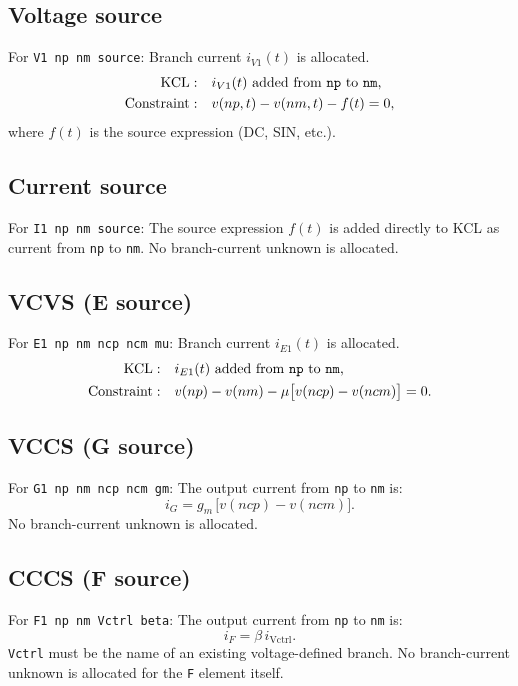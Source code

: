 \documentclass[11pt,a4paper]{article}
\newcommand{\code}[1]{\texttt{#1}}
\begin{document}
\subsection{Voltage source}

For \code{V1 np nm source}:
Branch current \(i_{V1}(t)\) is allocated.
\begin{align}
    \text{KCL}: & \quad i_{V1}(t) \text{ added from \code{np} to \code{nm},} \\
    \text{Constraint}: & \quad v(np,t) - v(nm,t) - f(t) = 0,
\end{align}
where \(f(t)\) is the source expression (DC, SIN, etc.).

\subsection{Current source}

For \code{I1 np nm source}:
The source expression \(f(t)\) is added directly to KCL as current from
\code{np} to \code{nm}.
No branch-current unknown is allocated.

\subsection{VCVS (E source)}

For \code{E1 np nm ncp ncm mu}:
Branch current \(i_{E1}(t)\) is allocated.
\begin{align}
    \text{KCL}: & \quad i_{E1}(t) \text{ added from \code{np} to \code{nm},} \\
    \text{Constraint}: & \quad
        v(np) - v(nm) - \mu\bigl[v(ncp) - v(ncm)\bigr] = 0.
\end{align}

\subsection{VCCS (G source)}

For \code{G1 np nm ncp ncm gm}:
The output current from \code{np} to \code{nm} is:
\begin{equation}
    i_G = g_m\,\bigl[v(ncp) - v(ncm)\bigr].
\end{equation}
No branch-current unknown is allocated.

\subsection{CCCS (F source)}

For \code{F1 np nm Vctrl beta}:
The output current from \code{np} to \code{nm} is:
\begin{equation}
    i_F = \beta\,i_{\mathrm{Vctrl}}.
\end{equation}
\code{Vctrl} must be the name of an existing voltage-defined branch.
No branch-current unknown is allocated for the \code{F} element itself.
\end{document}
